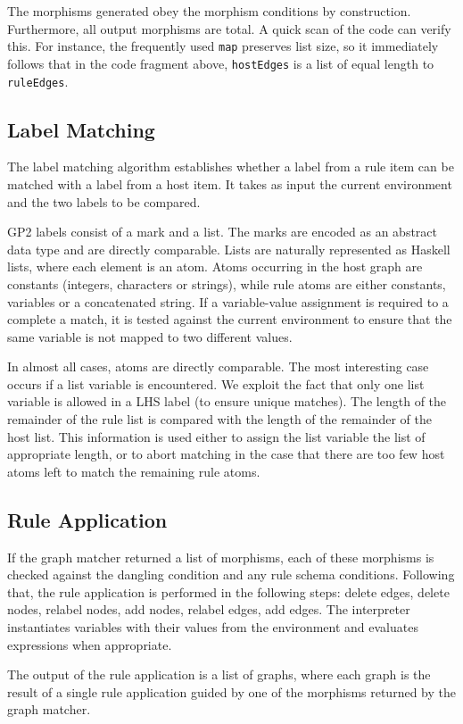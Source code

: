 The morphisms generated obey the morphism conditions by construction. Furthermore, all output morphisms are total. A quick scan of the code can verify this. For instance, the frequently used \texttt{map} preserves list size, so it immediately follows that in the code fragment above, \texttt{hostEdges} is a list of equal length to \texttt{ruleEdges}. 


\subsection{Label Matching}

The label matching algorithm establishes whether a label from a rule item can be matched with a label from a host item. It takes as input the current environment and the two labels to be compared. 

GP2 labels consist of a mark and a list. The marks are encoded as an abstract data type and are directly comparable. Lists are naturally represented as Haskell lists, where each element is an atom. Atoms occurring in the host graph are constants (integers, characters or strings), while rule atoms are either constants, variables or a concatenated string. If a variable-value assignment is required to a complete a match, it is tested against the current environment to ensure that the same variable is not mapped to two different values. 

In almost all cases, atoms are directly comparable. The most interesting case occurs if a list variable is encountered. We exploit the fact that only one list variable is allowed in a LHS label (to ensure unique matches). The length of the remainder of the rule list is compared with the length of the remainder of the host list. This information is used either to assign the list variable the list of appropriate length, or to abort matching in the case that there are too few host atoms left to match the remaining rule atoms.

\subsection{Rule Application}

If the graph matcher returned a list of morphisms, each of these morphisms is checked against the dangling condition and any rule schema conditions. Following that, the rule application is performed in the following steps: delete edges, delete nodes, relabel nodes, add nodes, relabel edges, add edges. The interpreter instantiates variables with their values from the environment and evaluates expressions when appropriate.

The output of the rule application is a list of graphs, where each graph is the result of a single rule application guided by one of the morphisms returned by the graph matcher.

